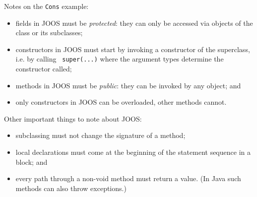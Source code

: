 \begin{slide*}
Notes on the {\tt Cons} example:
\begin{itemize}
\item fields in JOOS must be {\em protected}: they can only be accessed via
objects of the class or its subclasses;
\item constructors in JOOS must start by
invoking a constructor of the superclass, i.e. by calling {\tt
  super(...)} where the argument types determine the constructor called;
\item methods in JOOS must be {\em public}: they can be invoked by any object; and
\item only constructors in JOOS can be overloaded, other methods
  cannot.
\end{itemize}
\vfil
\end{slide*}

\begin{slide*}
Other important things to note about JOOS:
\begin{itemize}
  \item subclassing must not change the signature of a method;
  \item local declarations must come at the beginning of the statement sequence
  in a block; and
  \item every path through a non-void method must return a value. (In Java such
  methods can also throw exceptions.)
\end{itemize}
\vfil
\end{slide*}

